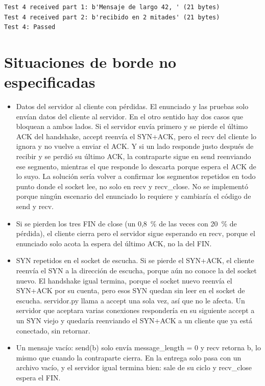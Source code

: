 \documentclass[
	spanish, %
	letterpaper, oneside
]{article}
\newcommand{\code}[1]{#1}     %
\newcommand{\flag}[1]{#1}     %
\newcommand{\field}[1]{#1}    %
\begin{document}
{\small
\begin{verbatim}
Test 4 received part 1: b'Mensaje de largo 42, ' (21 bytes)
Test 4 received part 2: b'recibido en 2 mitades' (21 bytes)
Test 4: Passed
\end{verbatim}}

\section{Situaciones de borde no especificadas}
\label{sec:bordes}
\begin{itemize}
	\item Datos del servidor al cliente con pérdidas. El enunciado y las pruebas solo envían datos
	del cliente al servidor. En el otro sentido hay dos casos que bloquean a ambos lados. Si el
	servidor envía primero y se pierde el último \flag{ACK} del handshake, \code{accept} reenvía el
	\flag{SYN+ACK}, pero el \code{recv} del cliente lo ignora y no vuelve a enviar el \flag{ACK}. Y
	si un lado responde justo después de recibir y se perdió su último \flag{ACK}, la contraparte
	sigue en \code{send} reenviando ese segmento, mientras el que responde lo descarta porque
	espera el \flag{ACK} de lo suyo. La solución sería volver a confirmar los segmentos repetidos en
	todo punto donde el socket lee, no solo en \code{recv} y \code{recv\_close}. No se implementó
	porque ningún escenario del enunciado lo requiere y cambiaría el código de \code{send} y
	\code{recv}.
	\item Si se pierden los tres \flag{FIN} de \code{close} (un 0,8~\% de las veces con 20~\% de
	pérdida), el cliente cierra pero el servidor sigue esperando en \code{recv}, porque el
	enunciado solo acota la espera del último \flag{ACK}, no la del \flag{FIN}.
	\item \flag{SYN} repetidos en el socket de escucha. Si se pierde el \flag{SYN+ACK}, el cliente
	reenvía el \flag{SYN} a la dirección de escucha, porque aún no conoce la del socket nuevo. El
	handshake igual termina, porque el socket nuevo reenvía el \flag{SYN+ACK} por su cuenta, pero
	esos \flag{SYN} quedan sin leer en el socket de escucha. \code{servidor.py} llama a
	\code{accept} una sola vez, así que no le afecta. Un servidor que aceptara varias conexiones
	respondería en su siguiente \code{accept} a un \flag{SYN} viejo y quedaría reenviando el
	\flag{SYN+ACK} a un cliente que ya está conectado, sin retornar.
	\item Un mensaje vacío: \code{send(b\textquotedbl\textquotedbl{})} solo envía \field{message\_length} = 0 y \code{recv}
	retorna \code{b\textquotedbl\textquotedbl{}}, lo mismo que cuando la contraparte cierra. En la entrega solo pasa con un
	archivo vacío, y el servidor igual termina bien: sale de su ciclo y \code{recv\_close} espera
	el \flag{FIN}.
\end{itemize}
\end{document}

